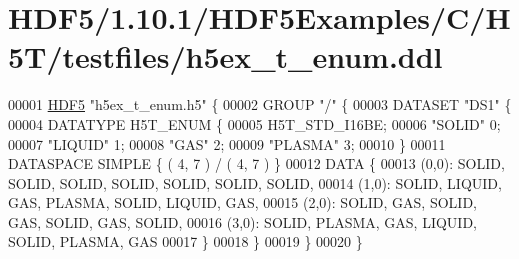 \hypertarget{_h_d_f5_21_810_81_2_h_d_f5_examples_2_c_2_h5_t_2testfiles_2h5ex__t__enum_8ddl_source}{}\section{H\+D\+F5/1.10.1/\+H\+D\+F5\+Examples/\+C/\+H5\+T/testfiles/h5ex\+\_\+t\+\_\+enum.ddl}
\label{_h_d_f5_21_810_81_2_h_d_f5_examples_2_c_2_h5_t_2testfiles_2h5ex__t__enum_8ddl_source}

\begin{DoxyCode}
00001 \hyperlink{namespace_h_d_f5}{HDF5} \textcolor{stringliteral}{"h5ex\_t\_enum.h5"} \{
00002 GROUP \textcolor{stringliteral}{"/"} \{
00003    DATASET \textcolor{stringliteral}{"DS1"} \{
00004       DATATYPE  H5T\_ENUM \{
00005          H5T\_STD\_I16BE;
00006          \textcolor{stringliteral}{"SOLID"}            0;
00007          \textcolor{stringliteral}{"LIQUID"}           1;
00008          \textcolor{stringliteral}{"GAS"}              2;
00009          \textcolor{stringliteral}{"PLASMA"}           3;
00010       \}
00011       DATASPACE  SIMPLE \{ ( 4, 7 ) / ( 4, 7 ) \}
00012       DATA \{
00013       (0,0): SOLID, SOLID, SOLID, SOLID, SOLID, SOLID, SOLID,
00014       (1,0): SOLID, LIQUID, GAS, PLASMA, SOLID, LIQUID, GAS,
00015       (2,0): SOLID, GAS, SOLID, GAS, SOLID, GAS, SOLID,
00016       (3,0): SOLID, PLASMA, GAS, LIQUID, SOLID, PLASMA, GAS
00017       \}
00018    \}
00019 \}
00020 \}
\end{DoxyCode}
